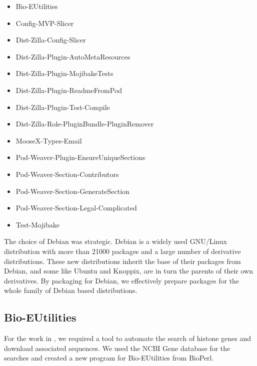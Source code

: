 \begin{table}
  \label{tab:software:debian-packages}
  \begin{itemize}
  \item Bio-EUtilities
  \item Config-MVP-Slicer
  \item Dist-Zilla-Config-Slicer
  \item Dist-Zilla-Plugin-AutoMetaResources
  \item Dist-Zilla-Plugin-MojibakeTests
  \item Dist-Zilla-Plugin-ReadmeFromPod
  \item Dist-Zilla-Plugin-Test-Compile
  \item Dist-Zilla-Role-PluginBundle-PluginRemover
  \item MooseX-Types-Email
  \item Pod-Weaver-Plugin-EnsureUniqueSections
  \item Pod-Weaver-Section-Contributors
  \item Pod-Weaver-Section-GenerateSection
  \item Pod-Weaver-Section-Legal-Complicated
  \item Test-Mojibake
  \end{itemize}
\end{table}


The choice of Debian was strategic.  Debian is a widely used GNU/Linux
distribution with more than 21000 packages and a large
number of derivative distributions.  These new distributions
inherit the base of their packages from Debian, and some like Ubuntu
and Knoppix, are in turn the parents of their own derivatives.  By packaging
for Debian, we effectively prepare packages for the whole family of
Debian based distributions.

\subsection{Bio-EUtilities}

For the work in , we required a tool to
automate the search of histone genes and download associated sequences.
We used the NCBI Gene database for the searches and
created a new program for Bio-EUtilities from BioPerl.

